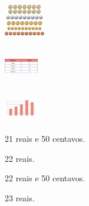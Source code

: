 \begin{escolha}
\begin{escolha}
\includegraphics[width=0.69797in,height=0.67970in]{media/image120.png}

\includegraphics[width=0.57930in,height=0.57462in]{media/image121.png}

\includegraphics[width=0.57293in,height=0.51122in]{media/image122.png}






\begin{minipage}{.5\textwidth}
\begin{escolha}
\item 21 reais e 50 centavos.

\item 22 reais.

\item 22 reais e 50 centavos.

\item 23 reais.
\end{escolha}
\end{minipage}


\end{escolha}
\end{escolha}
